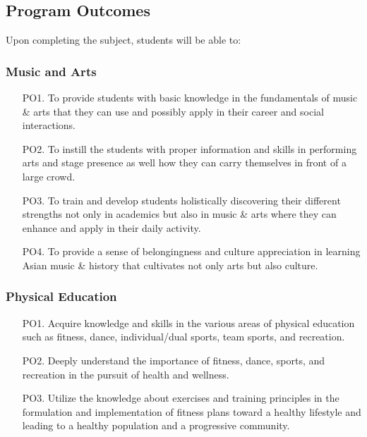 \subsection{Program Outcomes}
Upon completing the subject, students will be able to: 

\subsubsection{\textbf{Music and Arts}}

\begin{itemize}[label=PO\arabic*.]
	\item [PO1.] To provide students with basic knowledge in the fundamentals of music \& arts that they can use and possibly apply in their career and social interactions.
	\item [PO2.] To instill the students with proper information and skills in performing arts and stage presence as well how they can carry themselves in front of a large crowd. 
	\item [PO3.] To train and develop students holistically discovering their different strengths not only in academics but also in music \& arts where they can enhance and apply in their daily activity.
	\item [PO4.] To provide a sense of belongingness and culture appreciation in learning Asian music \& history that cultivates not only arts but also culture.
\end{itemize}

\subsubsection{\textbf{Physical Education}}

\begin{itemize}[label=PO\arabic*.]
	\item  [PO1.] Acquire knowledge and skills in the various areas of physical education such as fitness, dance, individual/dual sports, team sports, and recreation. 
	\item  [PO2.] Deeply understand the importance of fitness, dance, sports, and recreation in the pursuit of health and wellness.
	\item  [PO3.] Utilize the knowledge about exercises and training principles in the formulation and implementation of fitness plans toward a healthy lifestyle and leading to a healthy population and a progressive community.
\end{itemize}

